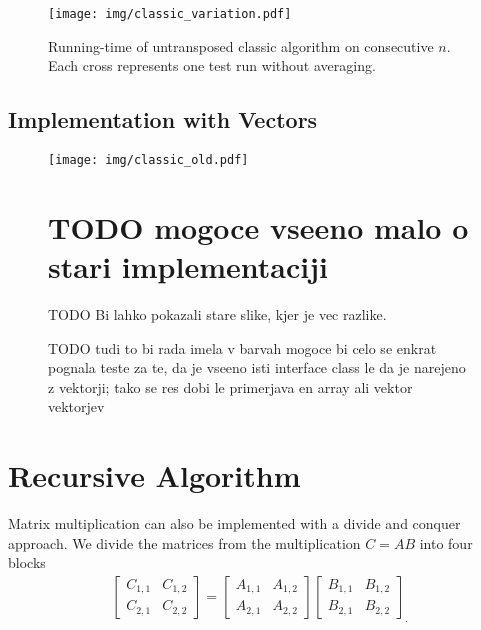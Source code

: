 \documentclass[a4paper,11pt]{article}
\begin{document}
\begin{figure}[h]
\centering
\texttt{[image: img/classic\_variation.pdf]}

\caption{Running-time of untransposed classic algorithm on consecutive $n$. Each cross represents one test run without averaging.}
\label{fig:classic_var}
\end{figure}


\subsection{Implementation with Vectors}

\begin{figure}[h]
\centering
\texttt{[image: img/classic\_old.pdf]}

\section{TODO mogoce vseeno malo o stari implementaciji}
TODO Bi lahko pokazali stare slike, kjer je vec razlike.

\caption{TODO tudi to bi rada imela v barvah mogoce bi celo se enkrat pognala teste za te, da je vseeno isti interface class le da je narejeno z vektorji; tako se res dobi le primerjava en array ali vektor vektorjev}
\label{fig:classic_old}
\end{figure}

\section{Recursive Algorithm}

Matrix multiplication can also be implemented with a divide and conquer approach\cite{Cormen2009}. We divide the matrices from the multiplication $C=AB$ into four blocks
\begin{align*}
\begin{bmatrix}
C_{1,1} & C_{1,2} \\
C_{2,1} & C_{2,2}
\end{bmatrix}
=
\begin{bmatrix}
A_{1,1} & A_{1,2} \\
A_{2,1} & A_{2,2}
\end{bmatrix}
\begin{bmatrix}
B_{1,1} & B_{1,2} \\
B_{2,1} & B_{2,2}
\end{bmatrix}
_{\text{.}}
\end{align*}
\end{document}
